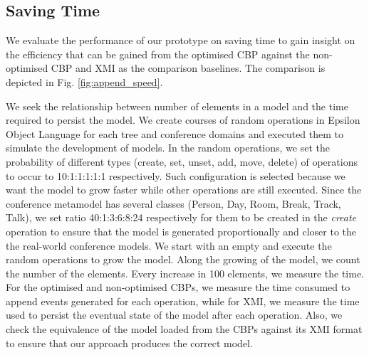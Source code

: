 \documentclass{llncs}
\begin{document}
\subsection{Saving Time}
\label{subsec:saving_time_test}
We evaluate the performance of our prototype on saving time to gain insight on the efficiency that can be gained from the optimised CBP against the non-optimised CBP and XMI as the comparison baselines. The comparison is depicted in Fig. \ref{fig:append_speed}.

We seek the relationship between number of elements in a model and the time required to persist the model. We create courses of random operations in Epsilon Object Language \cite{kolovos2006epsilon} for each tree and conference domains and executed them to simulate the development of models. In the random operations, we set the probability of different types (create, set, unset, add, move, delete) of operations to occur to 10:1:1:1:1:1 respectively. Such configuration is selected because we want the model to grow faster while other operations are still executed. Since the conference metamodel has several classes (Person, Day, Room, Break, Track, Talk), we set ratio 40:1:3:6:8:24 respectively for them to be created in the \emph{create} operation to ensure that the model is generated proportionally and closer to the the real-world conference models. We start with an empty and execute the random operations to grow the model. Along the growing of the model, we count the number of the elements. Every increase in 100 elements, we measure the time. For  the optimised and non-optimised CBPs, we measure the time consumed to append events generated for each operation, while for XMI, we measure the time used to persist the eventual state of the model after each operation. Also, we check the equivalence of the model loaded from the CBPs against its XMI format to ensure that our approach produces the correct  model.
\end{document}
